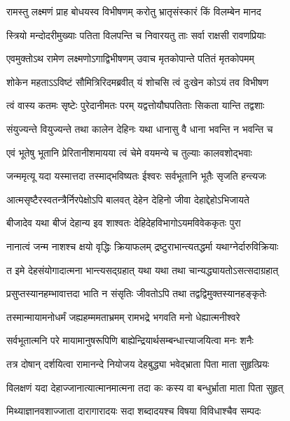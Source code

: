 \twolineshloka
{रामस्तु लक्ष्मणं प्राह बोधयस्व विभीषणम्}
{करोतु भ्रातृसंस्कारं किं विलम्बेन मानद} %

\twolineshloka
{स्त्रियो मन्दोदरीमुख्याः पतिता विलपन्ति च}
{निवारयतु ताः सर्वा राक्षसी रावणप्रियाः} %

\twolineshloka
{एवमुक्तोऽथ रामेण लक्ष्मणोऽगाद्विभीषणम्}
{उवाच मृतकोपान्ते पतितं मृतकोपमम्} %

\twolineshloka
{शोकेन महताऽऽविष्टं सौमित्रिरिदमब्रवीत्}
{यं शोचसि त्वं दुःखेन कोऽयं तव विभीषण} %

\twolineshloka
{त्वं वास्य कतमः सृष्टेः पुरेदानीमतः परम्}
{यद्वत्तोयौघपतिताः सिकता यान्ति तद्वशाः} %

\twolineshloka
{संयुज्यन्ते वियुज्यन्ते तथा कालेन देहिनः}
{यथा धानासु वै धाना भवन्ति न भवन्ति च} %

\twolineshloka
{एवं भूतेषु भूतानि प्रेरितानीशमायया}
{त्वं चेमे वयमन्ये च तुल्याः कालवशोद्भवाः} %

\twolineshloka
{जन्ममृत्यू यदा यस्मात्तदा तस्माद्भविष्यतः}
{ईश्वरः सर्वभूतानि भूतैः सृजति हन्त्यजः} %

\twolineshloka
{आत्मसृष्टैरस्वतन्त्रैर्निरपेक्षोऽपि बालवत्}
{देहेन देहिनो जीवा देहाद्देहोऽभिजायते} %

\twolineshloka
{बीजादेव यथा बीजं देहान्य इव शाश्वतः}
{देहिदेहविभागोऽयमविवेककृतः पुरा} %

\twolineshloka
{नानात्वं जन्म नाशश्च क्षयो वृद्धिः क्रियाफलम्}
{द्रष्टुराभान्त्यतद्धर्मा यथाग्नेर्दारुविक्रियाः} %

\twolineshloka
{त इमे देहसंयोगादात्मना भान्त्यसद्ग्रहात्}
{यथा यथा तथा चान्यद्ध्यायतोऽसत्सदाग्रहात्} %

\twolineshloka
{प्रसुप्तस्यानहम्भावात्तदा भाति न संसृतिः}
{जीवतोऽपि तथा तद्वद्विमुक्तस्यानहङ्कृतेः} %

\twolineshloka
{तस्मान्मायामनोधर्मं जह्यहम्ममताभ्रमम्}
{रामभद्रे भगवति मनो धेह्यात्मनीश्वरे} %

\twolineshloka
{सर्वभूतात्मनि परे मायामानुषरूपिणि}
{बाह्येन्द्रियार्थसम्बन्धात्त्याजयित्वा मनः शनैः} %

\twolineshloka
{तत्र दोषान् दर्शयित्वा रामानन्दे नियोजय}
{देहबुद्ध्या भवेद्भ्राता पिता माता सुहृत्प्रियः} %

\twolineshloka
{विलक्षणं यदा देहाज्जानात्यात्मानमात्मना}
{तदा कः कस्य वा बन्धुर्भ्राता माता पिता सुहृत्} %

\twolineshloka
{मिथ्याज्ञानवशाज्जाता दारागारादयः सदा}
{शब्दादयश्च विषया विविधाश्चैव सम्पदः} %

